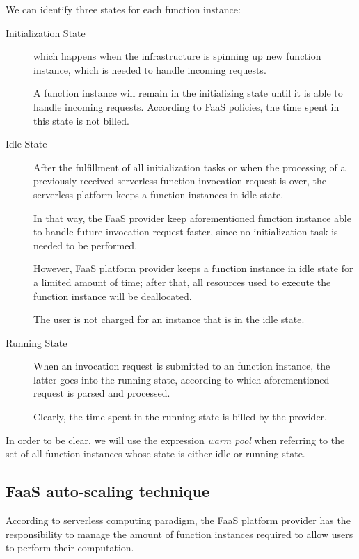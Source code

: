 \documentclass[12pt,a4paper]{report}
\theoremstyle{definition}
\begin{document}
We can identify three states for each function instance:

\begin{description}
	
	\item[Initialization State] which happens when the infrastructure is spinning up new function instance, which is needed to handle incoming requests. 
	
	A function instance will remain in the initializing state until it is able to handle incoming requests. According to FaaS policies, the time spent in this state is not billed. 
	
	\item[Idle State] After the fulfillment of all initialization tasks or when the processing of a previously received serverless function invocation request is over, the serverless platform keeps a function instances in idle state.
	
	In that way, the FaaS provider keep aforementioned function instance able to handle future invocation request faster, since no initialization task is needed to be performed.
	
	However, FaaS platform provider keeps a function instance in idle state for a limited amount of time; after that, all resources used to execute the function instance will be deallocated.
	
	The user is not charged for an instance that is in the idle state.
	
	\item[Running State] When an invocation request is submitted to an function instance, the latter goes into the running state, according to which aforementioned request is parsed and processed.
	
	Clearly, the time spent in the running state is billed by the provider.
	
\end{description}

In order to be clear, we will use the expression \textit{warm pool} when referring to the set of all function instances whose state is either idle or running state.

\subsection{FaaS auto-scaling technique}

According to serverless computing paradigm, the FaaS platform provider has the responsibility to manage the amount of function instances required to allow users to perform their computation.
\end{document}
